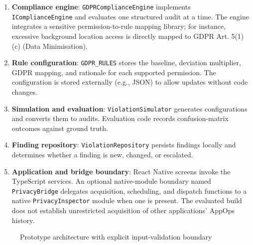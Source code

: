\begin{enumerate}
\item \textbf{Compliance engine}: \texttt{GDPRComplianceEngine} implements \texttt{IComplianceEngine} and evaluates one structured audit at a time. The engine integrates a sensitive permission-to-rule mapping library; for instance, excessive background location access is directly mapped to GDPR Art. 5(1)(c) (Data Minimisation).
\item \textbf{Rule configuration}: \texttt{GDPR\_RULES} stores the baseline, deviation multiplier, GDPR mapping, and rationale for each supported permission. The configuration is stored externally (e.g., JSON) to allow updates without code changes.
\item \textbf{Simulation and evaluation}: \texttt{ViolationSimulator} generates configurations and converts them to audits. Evaluation code records confusion-matrix outcomes against ground truth.
\item \textbf{Finding repository}: \texttt{ViolationRepository} persists findings locally and determines whether a finding is new, changed, or escalated.
\item \textbf{Application and bridge boundary}: React Native screens invoke the TypeScript services. An optional native-module boundary named \texttt{PrivacyBridge} delegates acquisition, scheduling, and dispatch functions to a native \texttt{PrivacyInspector} module when one is present. The evaluated build does not establish unrestricted acquisition of other applications' AppOps history.
\end{enumerate}

\begin{figure}[H]
\centering
{}
\caption{Prototype architecture with explicit input-validation boundary}
\label{fig:final-architecture}
\end{figure}

